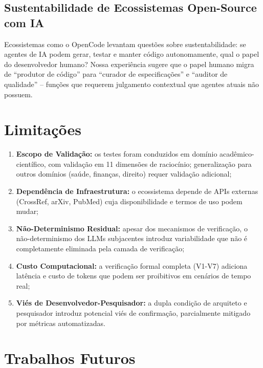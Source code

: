 \documentclass[12pt,a4paper,sumario=tradicional]{abntex2}
\begin{document}
\subsection{Sustentabilidade de Ecossistemas Open-Source com IA}

Ecossistemas como o OpenCode levantam questões sobre sustentabilidade: se agentes de IA podem gerar, testar e manter código autonomamente, qual o papel do desenvolvedor humano? Nossa experiência sugere que o papel humano migra de ``produtor de código'' para ``curador de especificações'' e ``auditor de qualidade'' -- funções que requerem julgamento contextual que agentes atuais não possuem.

\section{Limitações}

\begin{enumerate}[leftmargin=*]
    \item \textbf{Escopo de Validação:} os testes foram conduzidos em domínio acadêmico-científico, com validação em 11 dimensões de raciocínio; generalização para outros domínios (saúde, finanças, direito) requer validação adicional;
    \item \textbf{Dependência de Infraestrutura:} o ecossistema depende de APIs externas (CrossRef, arXiv, PubMed) cuja disponibilidade e termos de uso podem mudar;
    \item \textbf{Não-Determinismo Residual:} apesar dos mecanismos de verificação, o não-determinismo dos LLMs subjacentes introduz variabilidade que não é completamente eliminada pela camada de verificação;
    \item \textbf{Custo Computacional:} a verificação formal completa (V1-V7) adiciona latência e custo de tokens que podem ser proibitivos em cenários de tempo real;
    \item \textbf{Viés de Desenvolvedor-Pesquisador:} a dupla condição de arquiteto e pesquisador introduz potencial viés de confirmação, parcialmente mitigado por métricas automatizadas.
\end{enumerate}

\section{Trabalhos Futuros}
\end{document}
